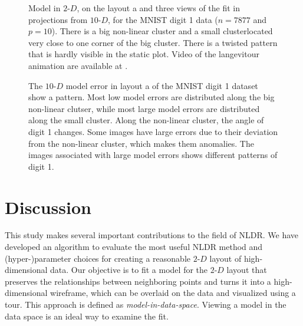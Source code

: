 \documentclass[
  12pt]{article}
\newcommand\gD{$2\text{-}D$}
\begin{document}
\begin{figure}[H]


\caption{\label{fig-mnist-tri-proj}Model in \gD{}, on the layout a and
three views of the fit in projections from \(10\text{-}D\), for the
MNIST digit 1 data (\(n =  7877\) and \(p = 10\)). There is a big
non-linear cluster and a small clusterlocated very close to one corner
of the big cluster. There is a twisted pattern that is hardly visible in
the static plot. Video of the langevitour animation are available at .}

\end{figure}%

\begin{figure}[H]


\caption{\label{fig-model-error-mnist}The \(10\text{-}D\) model error in
layout a of the MNIST digit 1 dataset show a pattern. Most low model
errors are distributed along the big non-linear clutser, while most
large model errors are distributed along the small cluster. Along the
non-linear cluster, the angle of digit 1 changes. Some images have large
errors due to their deviation from the non-linear cluster, which makes
them anomalies. The images associated with large model errors shows
different patterns of digit 1.}

\end{figure}%

\section{Discussion}\label{sec-discussion}

This study makes several important contributions to the field of NLDR.
We have developed an algorithm to evaluate the most useful NLDR method
and (hyper-)parameter choices for creating a reasonable \gD{} layout of
high-dimensional data. Our objective is to fit a model for the \gD{}
layout that preserves the relationships between neighboring points and
turns it into a high-dimensional wireframe, which can be overlaid on the
data and visualized using a tour. This approach is defined as
\emph{model-in-data-space}. Viewing a model in the data space is an
ideal way to examine the fit.
\end{document}
